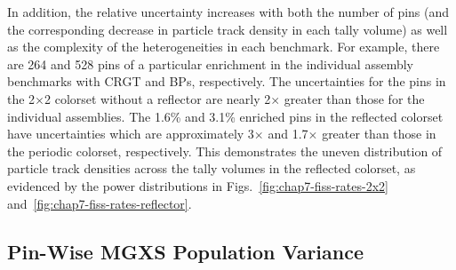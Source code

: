 {\begin{table}[H]
\begin{tabular}{C{2.5cm} l l C{3cm} C{3cm}}
\end{tabular}
\end{table}
}



In addition, the relative uncertainty increases with both the number of pins (and the corresponding decrease in particle track density in each tally volume) as well as the complexity of the heterogeneities in each benchmark. For example, there are 264 and 528 pins of a particular enrichment in the individual assembly benchmarks with \ac{CRGT} and \acp{BP}, respectively. The uncertainties for the pins in the 2$\times$2 colorset without a reflector are nearly 2$\times$ greater than those for the individual assemblies. The 1.6\% and 3.1\% enriched pins in the reflected colorset have uncertainties which are approximately 3$\times$ and 1.7$\times$ greater than those in the periodic colorset, respectively. This demonstrates the uneven distribution of particle track densities across the tally volumes in the reflected colorset, as evidenced by the power distributions in Figs.~\ref{fig:chap7-fiss-rates-2x2} and~\ref{fig:chap7-fiss-rates-reflector}.

\subsection{Pin-Wise MGXS Population Variance}
\label{subsec:chap9-pop-var}

